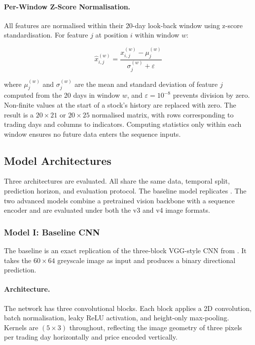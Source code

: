 \paragraph{Per-Window Z-Score Normalisation.}
All features are normalised within their 20-day look-back window using z-score standardisation. For feature $j$ at position $i$ within window $w$:

\begin{equation}
\hat{x}_{i,j}^{(w)} = \frac{x_{i,j}^{(w)} - \mu_j^{(w)}}{\sigma_j^{(w)} + \varepsilon}
\label{eq:zscore}
\end{equation}

where $\mu_j^{(w)}$ and $\sigma_j^{(w)}$ are the mean and standard deviation of feature $j$ computed from the 20 days in window $w$, and $\varepsilon = 10^{-8}$ prevents division by zero. Non-finite values at the start of a stock's history are replaced with zero. The result is a $20 \times 21$ or $20 \times 25$ normalised matrix, with rows corresponding to trading days and columns to indicators. Computing statistics only within each window ensures no future data enters the sequence inputs.

\subsection{Model Architectures}
\label{sec:architectures}

Three architectures are evaluated. All share the same data, temporal split, prediction horizon, and evaluation protocol. The baseline model replicates \textcite{Jiang2023}. The two advanced models combine a pretrained vision backbone with a sequence encoder and are evaluated under both the v3 and v4 image formats.

\subsubsection{Model I: Baseline CNN}
\label{sec:model1}

The baseline is an exact replication of the three-block VGG-style CNN from \textcite{Jiang2023}. It takes the $60 \times 64$ greyscale image as input and produces a binary directional prediction.

\paragraph{Architecture.}
The network has three convolutional blocks. Each block applies a 2D convolution, batch normalisation, leaky ReLU activation, and height-only max-pooling. Kernels are $(5 \times 3)$ throughout, reflecting the image geometry of three pixels per trading day horizontally and price encoded vertically.

